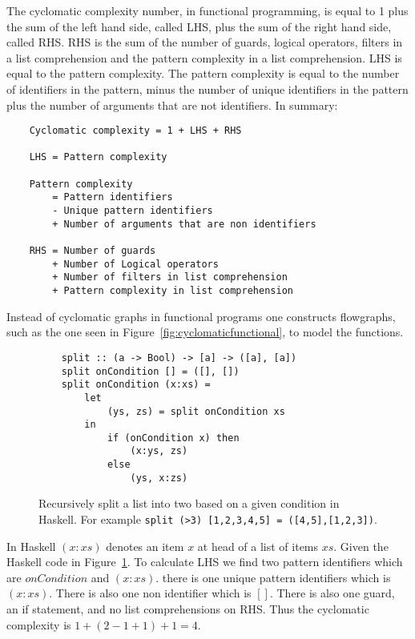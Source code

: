 \theoremstyle{definition} 
    \begin{definition} 
    The cyclomatic complexity number, in functional programming, is equal to
    1 plus the sum of the left hand side, called LHS, plus the sum of the
    right hand side, called RHS. RHS is the sum of the number of guards,
    logical operators, filters in a list comprehension and the pattern
    complexity in a list comprehension. LHS is equal to the pattern
    complexity.  The pattern complexity is equal to the number of
    identifiers in the pattern, minus the number of unique identifiers in
    the pattern plus the number of arguments that are not identifiers. In
    summary:

    \begin{lstlisting}
    Cyclomatic complexity = 1 + LHS + RHS

    LHS = Pattern complexity 

    Pattern complexity   
        = Pattern identifiers 
        - Unique pattern identifiers 
        + Number of arguments that are non identifiers

    RHS = Number of guards 
        + Number of Logical operators 
        + Number of filters in list comprehension 
        + Pattern complexity in list comprehension
    \end{lstlisting}
\end{definition}

Instead of cyclomatic graphs in functional programs one constructs flowgraphs,
such as the one seen in Figure~\ref{fig:cyclomaticfunctional}, to model the
functions.

\begin{figure}[H]
    \begin{lstlisting}
    split :: (a -> Bool) -> [a] -> ([a], [a])
    split onCondition [] = ([], [])
    split onCondition (x:xs) =
        let 
            (ys, zs) = split onCondition xs
        in 
            if (onCondition x) then 
                (x:ys, zs)
            else 
                (ys, x:zs)
    \end{lstlisting}
    \caption{Recursively split a list into two based on a given condition in
    Haskell. For example \texttt{split (>3) [1,2,3,4,5] =
    ([4,5],[1,2,3])}.}
    \label{split}
\end{figure}

In Haskell $(x:xs)$ denotes an item $x$ at head of a list of items $xs$. Given
the Haskell code in Figure~\ref{split}. To calculate LHS we find two
pattern identifiers which are $onCondition$ and $(x:xs)$. there is one unique
pattern identifiers which is $(x:xs)$. There is also one non identifier
which is $[]$. There is also one guard, an if statement, and no
list comprehensions on RHS. Thus the cyclomatic complexity is $1+(2-1+1)+1=4$.

